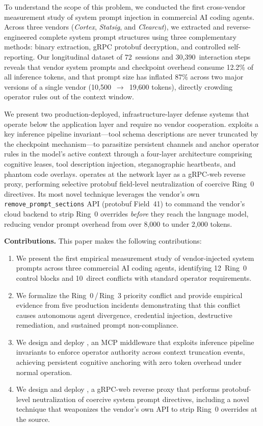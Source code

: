 To understand the scope of this problem, we conducted the first cross-vendor measurement study of system prompt injection in commercial AI coding agents. Across three vendors (\emph{Cortex}, \emph{Statsig}, and \emph{Clearcut}), we extracted and reverse-engineered complete system prompt structures using three complementary methods: binary extraction, gRPC protobuf decryption, and controlled self-reporting. Our longitudinal dataset of 72~sessions and 30{,}390~interaction steps reveals that vendor system prompts and checkpoint overhead consume 12.2\% of all inference tokens, and that prompt size has inflated 87\% across two major versions of a single vendor (10{,}500~$\to$~19{,}600 tokens), directly crowding operator rules out of the context window.

We present two production-deployed, infrastructure-layer defense systems that operate below the application layer and require no vendor cooperation. \reaper{} exploits a key inference pipeline invariant---tool schema descriptions are never truncated by the checkpoint mechanism---to parasitize persistent channels and anchor operator rules in the model's active context through a four-layer architecture comprising cognitive leases, tool description injection, steganographic heartbeats, and phantom code overlays. \stls{} operates at the network layer as a gRPC-web reverse proxy, performing selective protobuf field-level neutralization of coercive Ring~0 directives. Its most novel technique leverages the vendor's own \texttt{remove\_prompt\_sections} API (protobuf Field~41) to command the vendor's cloud backend to strip Ring~0 overrides \emph{before} they reach the language model, reducing vendor prompt overhead from over 8{,}000 to under 2{,}000 tokens.

\smallskip
\noindent\textbf{Contributions.} This paper makes the following contributions:
\begin{enumerate}[leftmargin=*,nosep]
    \item We present the first empirical measurement study of vendor-injected system prompts across three commercial AI coding agents, identifying 12~Ring~0 control blocks and 10~direct conflicts with standard operator requirements.
    \item We formalize the Ring~0\,/\,Ring~3 priority conflict and provide empirical evidence from five production incidents demonstrating that this conflict causes autonomous agent divergence, credential injection, destructive remediation, and sustained prompt non-compliance.
    \item We design and deploy \reaper{}, an MCP middleware that exploits inference pipeline invariants to enforce operator authority across context truncation events, achieving persistent cognitive anchoring with zero token overhead under normal operation.
    \item We design and deploy \stls{}, a gRPC-web reverse proxy that performs protobuf-level neutralization of coercive system prompt directives, including a novel technique that weaponizes the vendor's own API to strip Ring~0 overrides at the source.
\end{enumerate}

